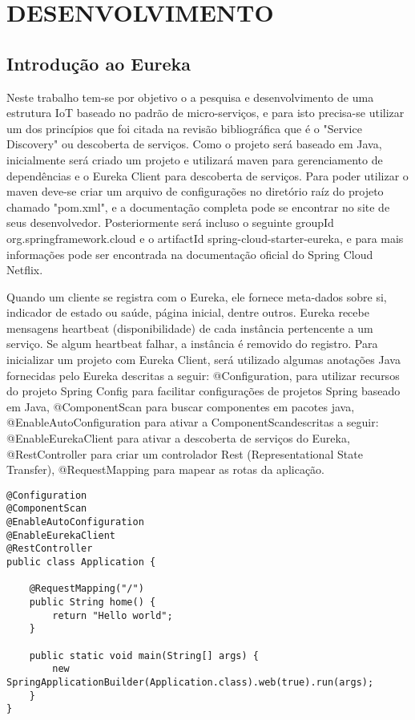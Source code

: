\section{DESENVOLVIMENTO}

\subsection{Introdução ao Eureka}

Neste trabalho tem-se por objetivo o a pesquisa e desenvolvimento de uma estrutura IoT baseado no padrão de micro-serviços, e para isto precisa-se utilizar um dos princípios que foi citada na revisão bibliográfica que é o "Service Discovery" ou descoberta de serviços. Como o projeto será baseado em Java, inicialmente será criado um projeto e  utilizará maven para gerenciamento de dependências e o Eureka Client para descoberta de serviços. Para poder utilizar o maven deve-se criar um arquivo de configurações no diretório raíz do projeto chamado "pom.xml", e a documentação completa pode se encontrar no site de seus desenvolvedor. Posteriormente será incluso o seguinte groupId org.springframework.cloud e o artifactId spring-cloud-starter-eureka, e para mais informações pode ser encontrada na documentação oficial do Spring Cloud Netflix.

Quando um cliente se registra com o Eureka, ele fornece meta-dados sobre si, indicador de estado ou saúde, página inicial, dentre outros. Eureka recebe mensagens heartbeat (disponibilidade) de cada instância pertencente a um serviço. Se algum heartbeat falhar, a instância é removido do registro.
Para inicializar um projeto com Eureka Client, será utilizado algumas anotações Java fornecidas pelo Eureka descritas a seguir: @Configuration, para utilizar recursos do projeto Spring Config para facilitar configurações de projetos Spring baseado em Java, @ComponentScan para buscar componentes em pacotes java, @EnableAutoConfiguration para ativar a ComponentScandescritas a seguir: @EnableEurekaClient para ativar a descoberta de serviços do Eureka, @RestController para criar um controlador Rest (Representational State Transfer), @RequestMapping para mapear as rotas da aplicação.

\begin{verbatim}
@Configuration
@ComponentScan
@EnableAutoConfiguration
@EnableEurekaClient
@RestController
public class Application {

    @RequestMapping("/")
    public String home() {
        return "Hello world";
    }

    public static void main(String[] args) {
        new SpringApplicationBuilder(Application.class).web(true).run(args);
    }
}
\end{verbatim}

